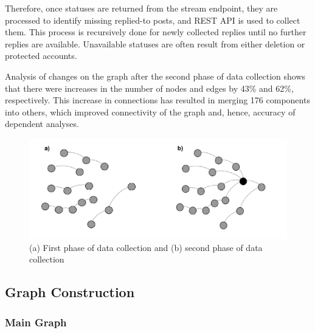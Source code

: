 \documentclass[sigconf]{acmart}
\begin{document}
Therefore, once statuses are returned from the stream endpoint, they
are processed to identify missing replied-to posts, and REST API is
used to collect them. This process is recursively done for newly
collected replies until no further replies are available. Unavailable
statuses are often result from either deletion or protected accounts.

Analysis of changes on the graph after the second phase of data
collection shows that there were increases in the number of nodes and
edges by 43\% and 62\%, respectively. This increase in connections has
resulted in merging 176 components into others, which improved
connectivity of the graph and, hence, accuracy of dependent analyses.

\begin{figure}[htb]
\centering
\includegraphics[width=\columnwidth]{images/datacollectionphases.png}
\caption{(a) First phase of data collection and (b) second phase of data
collection}
\label{fig:datacollectionphases}
\end{figure}


\subsection{Graph Construction}

\subsubsection{Main Graph}
\end{document}
